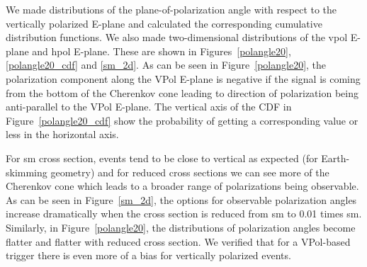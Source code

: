 We made distributions of the plane-of-polarization angle with respect to the vertically polarized E-plane and calculated the corresponding cumulative distribution functions. We also made two-dimensional distributions of the \gls{vpol} E-plane and \gls{hpol} E-plane. These are shown in Figures~\ref{polangle20}, \ref{polangle20_cdf} and \ref{sm_2d}.
As can be seen in Figure~\ref{polangle20}, the polarization component along the VPol E-plane is negative if the signal is coming from the bottom of the Cherenkov cone leading to direction of polarization being anti-parallel to the VPol 
E-plane. 
The vertical axis of the CDF in Figure~\ref{polangle20_cdf} show the probability of getting a corresponding value or less in the horizontal axis. 

For \gls{sm} cross section, events tend to be close to vertical as expected (for Earth-skimming geometry) and for reduced cross sections we can see more of the Cherenkov cone which leads to a broader range of polarizations being observable. As can be seen in Figure~\ref{sm_2d}, the options for observable polarization angles increase dramatically when the cross section is reduced from \gls{sm} to 0.01 times \gls{sm}. Similarly, in Figure~\ref{polangle20}, the distributions of polarization angles become flatter and flatter with reduced cross section. 
We verified that for a VPol-based trigger there is even more of a bias for vertically polarized events. 


